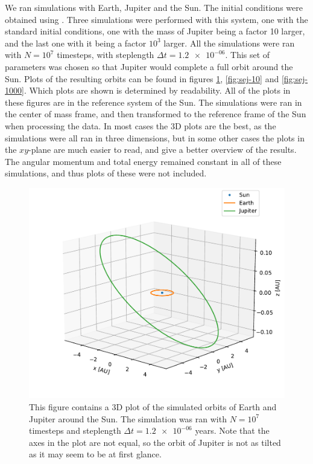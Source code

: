 \documentclass[reprint,english,notitlepage]{revtex4-1}  %
\begin{document}
We ran simulations with Earth, Jupiter and the Sun. The initial conditions were obtained using \citep{NASASolarInit}. Three simulations were performed with this system, one with the standard initial conditions, one with the mass of Jupiter being a factor 10 larger, and the last one with it being a factor $10^3$ larger. All the simulations were ran with $N=10^7$ timesteps, with steplength $\Delta t = \num{1.2e-06}$. This set of parameters was chosen so that Jupiter would complete a full orbit around the Sun. Plots of the resulting orbits can be found in figures \ref{fig:sej-standard}, \ref{fig:sej-10} and \ref{fig:sej-1000}. Which plots are shown is determined by readability. All of the plots in these figures are in the reference system of the Sun. The simulations were ran in the center of mass frame, and then transformed to the reference frame of the Sun when processing the data. In most cases the 3D plots are the best, as the simulations were all ran in three dimensions, but in some other cases the plots in the $xy$-plane are much easier to read, and give a better overview of the results. The angular momentum and total energy remained constant in all of these simulations, and thus plots of these were not included. 

\begin{figure}[H]
\includegraphics[width=\columnwidth]{../data/figures/sun-earth-jupiter/sej_1xM_vv_orbit3D.pdf}
\caption{This figure contains a 3D plot of the simulated orbits of Earth and Jupiter around the Sun. The simulation was ran with $N=10^7$ timesteps and steplength $\Delta t = \num{1.2e-06}$ years. Note that the axes in the plot are not equal, so the orbit of Jupiter is not as tilted as it may seem to be at first glance.}
\label{fig:sej-standard}
\end{figure}
\end{document}

